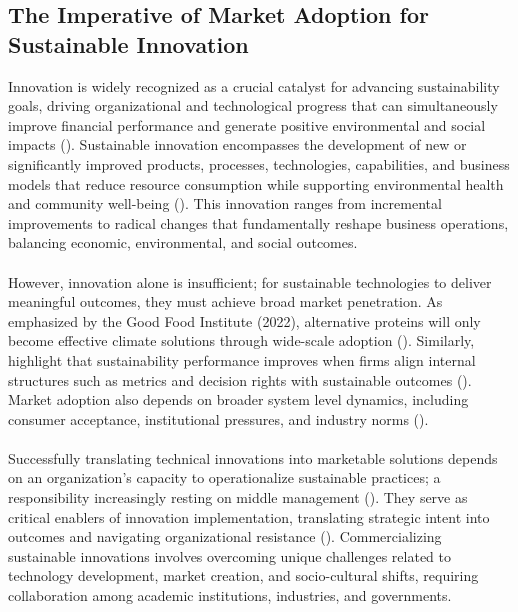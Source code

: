 	\subsection{The Imperative of Market Adoption for Sustainable Innovation}
	Innovation is widely recognized as a crucial catalyst for advancing sustainability goals, driving organizational and technological progress that can simultaneously improve financial performance and generate positive environmental and social impacts (\textcite{Boons2013, Schiederig2012}). Sustainable innovation encompasses the development of new or significantly improved products, processes, technologies, capabilities, and business models that reduce resource consumption while supporting environmental health and community well-being (\textcite{Adams2016}). This innovation ranges from incremental improvements to radical changes that fundamentally reshape business operations, balancing economic, environmental, and social outcomes.
	
	\paragraph*{} However, innovation alone is insufficient; for sustainable technologies to deliver meaningful outcomes, they must achieve broad market penetration. As emphasized by the Good Food Institute (2022), alternative proteins will only become effective climate solutions through wide-scale adoption (\textcite{GFI2022}). Similarly, \citeauthor{Eccles2014} highlight that sustainability performance improves when firms align internal structures such as metrics and decision rights with sustainable outcomes (\textcite{Eccles2014}). Market adoption also depends on broader system level dynamics, including consumer acceptance, institutional pressures, and industry norms (\textcite{Hall2003, Geels2002}).
	
	\paragraph*{} Successfully translating technical innovations into marketable solutions depends on an organization's capacity to operationalize sustainable practices; a responsibility increasingly resting on middle management (\textcite{Rafaeli2022}). They serve as critical enablers of innovation implementation, translating strategic intent into outcomes and navigating organizational resistance (\textcite{birkinshaw2004}). Commercializing sustainable innovations involves overcoming unique challenges related to technology development, market creation, and socio-cultural shifts, requiring collaboration among academic institutions, industries, and governments.
	

